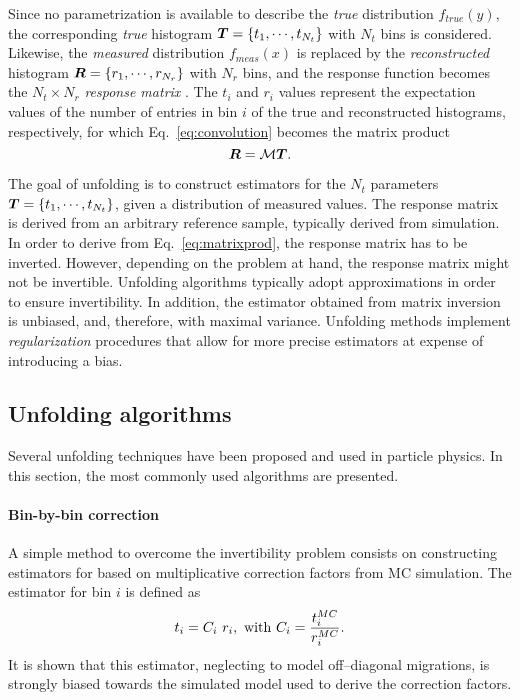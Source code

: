 Since no parametrization is available to describe the {\it true}
distribution $f_{true}(y)$, the corresponding {\it true} histogram
$\boldsymbol{T}{}=\{t_1,\cdots{},t_{N_t}\}$ with $N_t$ bins is
considered. Likewise, the {\it measured} distribution $f_{meas}(x)$ is
replaced by the {\it reconstructed} histogram $\boldsymbol{R}{}=\{r_1,\cdots{},r_{N_r}\}$ with
$N_r$ bins, and the response function becomes the $N_t\times N_r$ {\it
  response matrix} \TrasfMatrix{}.
The $t_i$ and $r_i$ values represent the expectation values of the number of
entries in bin $i$ of the true and reconstructed histograms,
respectively, for which Eq.~\ref{eq:convolution} becomes the matrix product
\begin{equation}
\label{eq:matrixprod}
\boldsymbol{R}{} = \mathcal{M}{}\boldsymbol{T}{}.
\end{equation}

The goal of unfolding is to construct estimators for the $N_t$
parameters $\boldsymbol{T}{}=\{t_1,\cdots{},t_{N_t}\}$, given a distribution
\Reco{} of measured values. The response matrix \TrasfMatrix{} is derived from
an arbitrary reference sample, typically derived from simulation.
In order to derive \Truth{} from Eq.~\ref{eq:matrixprod}, the response
matrix \TrasfMatrix{} has to be inverted. However, depending on the
problem at hand, the response matrix might not be
invertible. Unfolding algorithms typically adopt approximations in
order to ensure invertibility. In addition, the estimator obtained from
matrix inversion is unbiased, and, therefore, with maximal
variance. Unfolding methods implement {\it regularization} procedures
that allow for more precise estimators at expense of introducing a bias.

\subsection{Unfolding algorithms}

Several unfolding techniques have been proposed and used in particle
physics. In this section, the most commonly used algorithms are
presented.

\paragraph{Bin-by-bin correction}
A simple method to overcome the invertibility problem consists on
constructing estimators for \Truth{} based on multiplicative
correction factors from MC simulation. The estimator for bin $i$ is
defined as
\begin{equation}
t_i = C_i~r_i,~{\rm with}~C_i=\frac{t_i^{MC}}{r_i^{MC}}.
\end{equation}
It is shown that this estimator, neglecting to model off--diagonal
migrations, is strongly biased towards the simulated model used to
derive the correction factors. 
